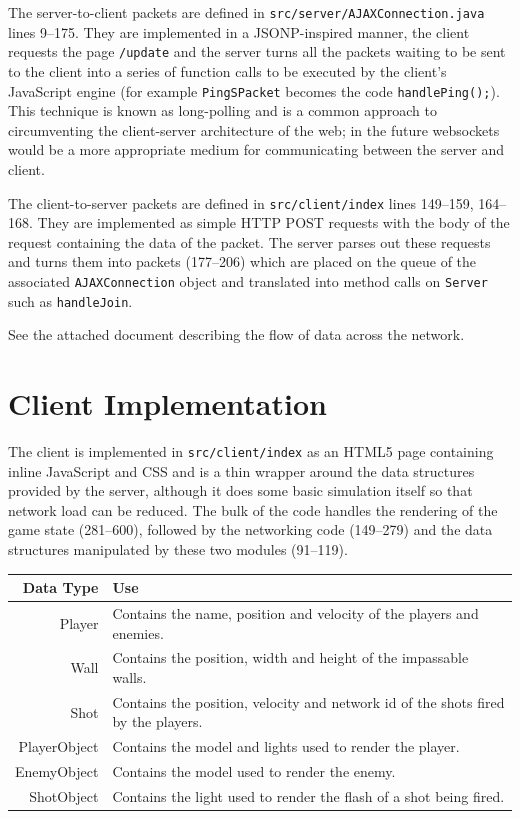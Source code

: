 \documentclass{article}
\begin{document}
The server-to-client packets are defined in \texttt{src/server/AJAXConnection.java}
lines 9--175.  They are implemented in a JSONP-inspired manner, the client requests
the page \texttt{/update} and the server turns all the packets waiting to be
sent to the client into a series of function calls to be executed by the
client's JavaScript engine (for example \texttt{PingSPacket} becomes the code
\texttt{handlePing();}).  This technique is known as long-polling and is a
common approach to circumventing the client-server architecture of the web; in
the future websockets would be a more appropriate medium for communicating
between the server and client.

The client-to-server packets are defined in \texttt{src/client/index} lines
149--159, 164--168.  They are implemented as simple HTTP POST requests with the
body of the request containing the data of the packet.  The server parses out
these requests and turns them into packets (177--206) which are placed on the
queue of the associated \texttt{AJAXConnection} object and translated into
method calls on \texttt{Server} such as \texttt{handleJoin}.

See the attached document describing the flow of data across the network.

\section{Client Implementation}
The client is implemented in \texttt{src/client/index} as an HTML5 page containing
inline JavaScript and CSS and is a thin wrapper around the data structures
provided by the server,
although it does some basic simulation itself so that network load can be
reduced.  The bulk of the code handles the rendering of the game state
(281--600), followed by the networking code (149--279) and the data structures
manipulated by these two modules (91--119).

\begin{tabular}{r|l}
\textbf{Data Type} & \textbf{Use} \\
\hline
Player & Contains the name, position and velocity of the players and enemies.\footnotemark[1] \\
Wall & Contains the position, width and height of the impassable walls. \\
Shot & Contains the position, velocity and network id of the shots fired by the players. \\
PlayerObject & Contains the model and lights used to render the player. \\
EnemyObject & Contains the model used to render the enemy. \\
ShotObject & Contains the light used to render the flash of a shot being fired.
\end{tabular}
\end{document}
